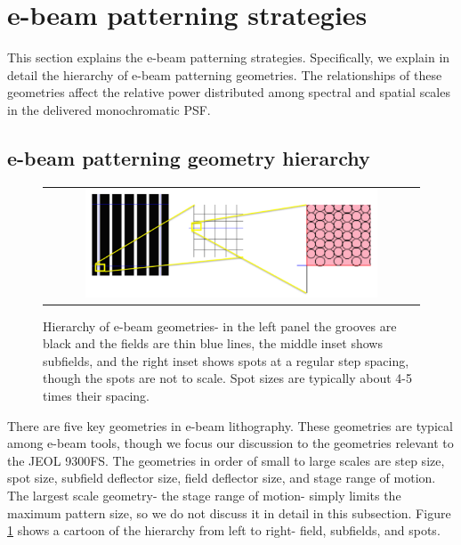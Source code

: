 \documentclass[]{spie}  %
\begin{document}
\section{e-beam patterning strategies}
This section explains the e-beam patterning strategies.  Specifically, we explain in detail the hierarchy of e-beam patterning geometries.  The relationships of these geometries affect the relative power distributed among spectral and spatial scales in the delivered monochromatic PSF.

\subsection{e-beam patterning geometry hierarchy}

\begin{figure}
\begin{center}
 \begin{tabular}{c}
    \includegraphics[width=0.8\textwidth]{figs/Field_sizes_cascade_02.png}
   \end{tabular}
  \end{center}
  \caption[e-beam Hierarchy]{\label{fig:Hierarchy} Hierarchy of e-beam geometries- in the left panel the grooves are black and the fields are thin blue lines, the middle inset shows subfields, and the right inset shows spots at a regular step spacing, though the spots are not to scale.  Spot sizes are typically about 4-5 times their spacing.}
\end{figure}


There are five key geometries in e-beam lithography.  These geometries are typical among e-beam tools, though we focus our discussion to the geometries relevant to the JEOL 9300FS.  The geometries in order of small to large scales are step size, spot size, subfield deflector size, field deflector size, and stage range of motion.  The largest scale geometry- the stage range of motion- simply limits the maximum pattern size, so we do not discuss it in detail in this subsection.  Figure \ref{fig:Hierarchy} shows a cartoon of the hierarchy from left to right- field, subfields, and spots.
\end{document}
